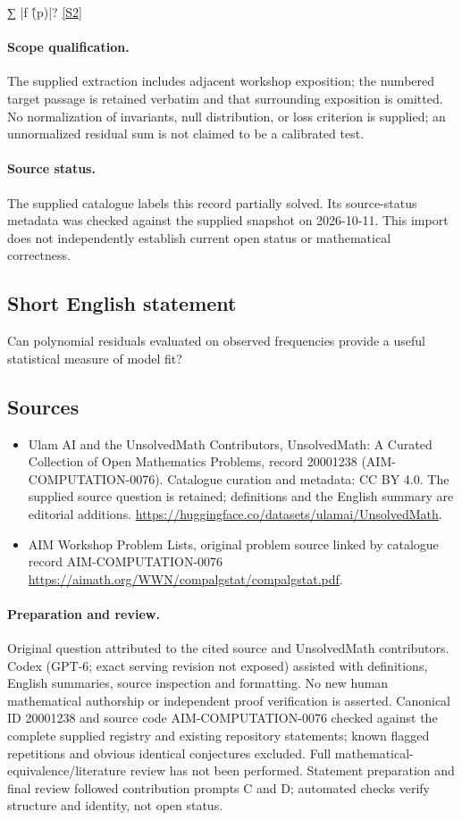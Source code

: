 \documentclass[11pt]{article}
\begin{document}
∑ |f (̂p)|? \href{https://aimath.org/WWN/compalgstat/compalgstat.pdf}{[S2]}
\paragraph{Scope qualification.}
The supplied extraction includes adjacent workshop exposition; the numbered target passage is retained verbatim and that surrounding exposition is omitted. No normalization of invariants, null distribution, or loss criterion is supplied; an unnormalized residual sum is not claimed to be a calibrated test.
\paragraph{Source status.}
The supplied catalogue labels this record partially solved. Its source-status metadata was checked against the supplied snapshot on 2026-10-11. This import does not independently establish current open status or mathematical correctness.
\subsection{Short English statement}
Can polynomial residuals evaluated on observed frequencies provide a useful statistical measure of model fit?
\subsection{Sources}
\begin{itemize}
\item[S1] Ulam AI and the UnsolvedMath Contributors, UnsolvedMath: A Curated Collection of Open Mathematics Problems, record 20001238 (AIM-COMPUTATION-0076). Catalogue curation and metadata: CC BY 4.0. The supplied source question is retained; definitions and the English summary are editorial additions.
\url{https://huggingface.co/datasets/ulamai/UnsolvedMath}.
\item[S2] AIM Workshop Problem Lists, original problem source linked by catalogue record AIM-COMPUTATION-0076
\url{https://aimath.org/WWN/compalgstat/compalgstat.pdf}.
\end{itemize}
\paragraph{Preparation and review.}
Original question attributed to the cited source and UnsolvedMath contributors. Codex (GPT-6; exact serving revision not exposed) assisted with definitions, English summaries, source inspection and formatting. No new human mathematical authorship or independent proof verification is asserted. Canonical ID 20001238 and source code AIM-COMPUTATION-0076 checked against the complete supplied registry and existing repository statements; known flagged repetitions and obvious identical conjectures excluded. Full mathematical-equivalence/literature review has not been performed. Statement preparation and final review followed contribution prompts C and D; automated checks verify structure and identity, not open status.
\label{end:20001238}
\end{document}
